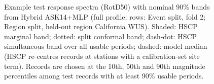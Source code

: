 \begin{figure}[htbp]
\centering
{}
\caption{Example test response spectra (RotD50) with nominal 90\% bands from Hybrid ASK14+MLP (full profile; rows: Event split, fold 2; Region split, held-out region California WUS). Shaded: HSCP marginal band; dotted: split conformal band; dash-dot: HSCP simultaneous band over all usable periods; dashed: model median (HSCP re-centres records at stations with a calibration-set site term). Records are chosen at the 10th, 50th and 90th magnitude percentiles among test records with at least 90\% usable periods.}
\label{fig:fig5_spectral_bands}
\end{figure}
